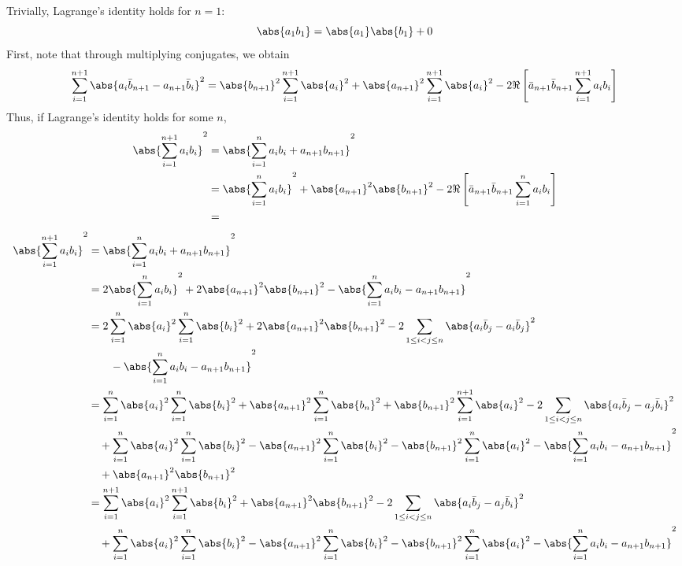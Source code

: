 \subsubsection{}
Trivially, Lagrange's identity holds for \(n=1\):
\[\abs{a_1b_1}=\abs{a_1}\abs{b_1}+0\]
First, note that through multiplying conjugates, we obtain
\[\sum_{i=1}^{n+1}\abs{a_i\bar b_{n+1}-a_{n+1}\bar b_i}^2=\abs{b_{n+1}}^2\sum_{i=1}^{n+1}\abs{a_i}^2+\abs{a_{n+1}}^2\sum_{i=1}^{n+1}\abs{a_i}^2-2\Re\left[\bar a_{n+1}\bar b_{n+1}\sum_{i=1}^{n+1}a_ib_i\right]\]
Thus, if Lagrange's identity holds for some \(n\),
\begin{align*}
	\abs{\sum_{i=1}^{n+1}a_ib_i}^2&=\abs{\sum_{i=1}^na_ib_i+a_{n+1}b_{n+1}}^2\\
				      &=\abs{\sum_{i=1}^{n}a_i b_i}^2 + \abs{a_{n+1}}^2\abs{b_{n+1}}^2-2\Re\left[\bar a_{n+1}\bar b_{n+1}\sum_{i=1}^{n}a_ib_i\right]\\
				      &=
\end{align*}
\newpage{}
\begin{align*}
	\abs{\sum_{i=1}^{n+1}a_ib_i}^2&=\abs{\sum_{i=1}^na_ib_i+a_{n+1}b_{n+1}}^2\\
				      &=2\abs{\sum_{i=1}^na_ib_i}^2+2\abs{a_{n+1}}^2\abs{b_{n+1}}^2-\abs{\sum_{i=1}^na_ib_i - a_{n+1}b_{n+1}}^2\\
				      &=2\sum_{i=1}^n\abs{a_i}^2\sum_{i=1}^n\abs{b_i}^2+2\abs{a_{n+1}}^2\abs{b_{n+1}}^2-2\sum_{1\leq i<j\leq n}\abs{a_i \bar b_j-a_i\bar b_j}^2\\
				      &\qquad-\abs{\sum_{i=1}^na_ib_i-a_{n+1}b_{n+1}}^2\\
				      &=\sum_{i=1}^n\abs{a_i}^2\sum_{i=1}^n\abs{b_i}^2+\abs{a_{n+1}}^2\sum_{i=1}^{n}\abs{b_n}^2+\abs{b_{n+1}}^2\sum_{i=1}^{n+1}\abs{a_{i}}^2-2\sum_{1\leq i<j\leq n}\abs{a_i \bar b_j-a_j\bar b_i}^2\\
				      &\quad+\sum_{i=1}^n\abs{a_i}^2\sum_{i=1}^n\abs{b_i}^2-\abs{a_{n+1}}^2\sum_{i=1}^{n}\abs{b_i}^2 -\abs{b_{n+1}}^2\sum_{i=1}^n\abs{a_i}^2-\abs{\sum_{i=1}^na_ib_i-a_{n+1}b_{n+1}}^2\\
				      &\quad+\abs{a_{n+1}}^2\abs{b_{n+1}}^2\\
				      &=\sum_{i=1}^{n+1}\abs{a_i}^2\sum_{i=1}^{n+1}\abs{b_i}^2+\abs{a_{n+1}}^2\abs{b_{n+1}}^2-2\sum_{1\leq i<j\leq n}\abs{a_i \bar b_j-a_j\bar b_i}^2\\
				      &\quad+\sum_{i=1}^n\abs{a_i}^2\sum_{i=1}^n\abs{b_i}^2-\abs{a_{n+1}}^2\sum_{i=1}^{n}\abs{b_i}^2 -\abs{b_{n+1}}^2\sum_{i=1}^n\abs{a_i}^2-\abs{\sum_{i=1}^na_ib_i-a_{n+1}b_{n+1}}^2\\
\end{align*}
